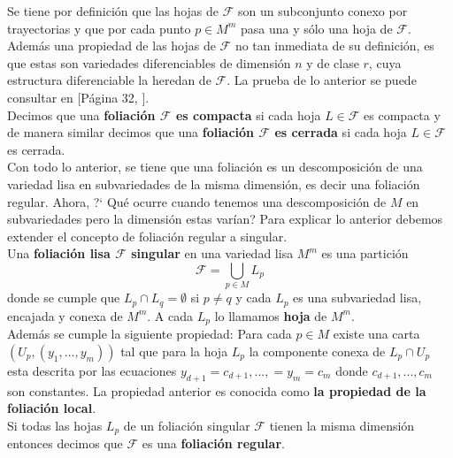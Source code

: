 \documentclass[a4paper,10pt]{book}
\begin{document}
Se tiene por definici\'on que las hojas de $\mathcal{F}$ son un subconjunto conexo por trayectorias y que por cada punto $p\in M^{m}$ pasa una y s\'olo una hoja de $\mathcal{F}$. Adem\'as una propiedad de las hojas de $\mathcal{F}$ no tan inmediata de su definici\'on, es que estas son variedades diferenciables de dimensi\'on $n$ y de clase $r$, cuya estructura diferenciable la heredan de $\mathcal{F}$. La prueba de lo anterior se puede consultar en [P\'agina 32, \cite{Camacho}].\\

Decimos que una {\bfseries foliaci\'on $\mathcal{F}$ es compacta} si cada hoja $L\in\mathcal{F}$ es compacta y de manera similar decimos que una {\bfseries foliaci\'on $\mathcal{F}$ es cerrada} si cada hoja $L\in\mathcal{F}$ es cerrada.\\

Con todo lo anterior, se tiene que una foliaci\'on es un descomposici\'on de una variedad lisa en subvariedades de la misma dimensi\'on, es decir una foliaci\'on regular. Ahora, ?` Qu\'e ocurre cuando tenemos una descomposici\'on de $M$ en subvariedades pero la dimensi\'on estas var\'ian? Para explicar lo anterior debemos extender el concepto de foliaci\'on regular a singular.\\

Una {\bfseries foliaci\'on lisa $\mathcal{F}$ singular} en una variedad lisa $M^{m}$ es una partici\'on 
\begin{equation*}
    \mathcal{F}=\bigcup\limits_{p\in M} L_{p}
\end{equation*}
donde se cumple que $L_{p}\cap L_{q}=\emptyset$ si $p\neq q$ y cada $L_{p}$ es una subvariedad lisa, encajada y conexa de $M^{m}$. A cada $L_{p}$ lo llamamos {\bfseries hoja} de $M^{m}$.\\

Adem\'as se cumple la siguiente propiedad: Para cada $p\in M$ existe una carta $(U_{p}, (y_{1},...,y_{m}))$ tal que para la hoja $L_{p}$ la componente conexa de $L_{p}\cap U_{p}$ esta  descrita por las ecuaciones $y_{d+1}=c_{d+1},...,=y_{m}=c_{m}$ donde $c_{d+1},...,c_{m}$ son constantes. La propiedad anterior es conocida como {\bfseries la propiedad de la foliaci\'on local}.\\

Si todas las hojas $L_{p}$ de un foliaci\'on singular $\mathcal{F}$ tienen la misma dimensi\'on entonces decimos que $\mathcal{F}$ es una {\bfseries foliaci\'on regular}.\\
\end{document}
